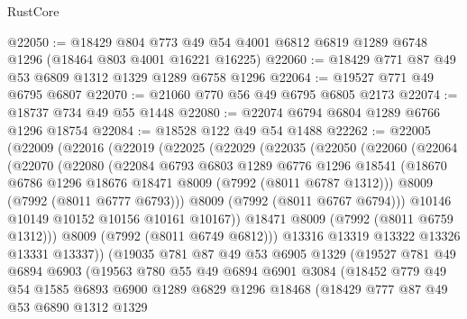 \begin{lexlean}{RustCore}
\begin{coremodule}
@22050 := @18429
    @804
    @773
    @49
    @54
    @4001
    @6812
    @6819
    @1289
    @6748
    @1296
    (@18464 @803 @4001 @16221 @16225)
@22060 := @18429 @771 @87 @49 @53 @6809 @1312 @1329 @1289 @6758 @1296
@22064 := @19527 @771 @49 @6795 @6807
@22070 := @21060 @770 @56 @49 @6795 @6805 @2173
@22074 := @18737 @734 @49 @55 @1448
@22080 := @22074 @6794 @6804 @1289 @6766 @1296 @18754
@22084 := @18528 @122 @49 @54 @1488
@22262 := @22005
    (@22009
      (@22016
        (@22019
          (@22025
            (@22029
              (@22035
                (@22050
                  (@22060
                    (@22064
                      (@22070
                        (@22080
                          (@22084
                            @6793
                            @6803
                            @1289
                            @6776
                            @1296
                            @18541
                            (@18670 @6786 @1296 @18676 @18471 @8009 (@7992 (@8011 @6787 @1312)))
                            @8009
                            (@7992 (@8011 @6777 @6793)))
                          @8009
                          (@7992 (@8011 @6767 @6794)))
                        @10146
                        @10149
                        @10152
                        @10156
                        @10161
                        @10167))
                    @18471
                    @8009
                    (@7992 (@8011 @6759 @1312)))
                  @8009
                  (@7992 (@8011 @6749 @6812)))
                @13316
                @13319
                @13322
                @13326
                @13331
                @13337))
            (@19035
              @781
              @87
              @49
              @53
              @6905
              @1329
              (@19527
                @781
                @49
                @6894
                @6903
                (@19563
                  @780
                  @55
                  @49
                  @6894
                  @6901
                  @3084
                  (@18452
                    @779
                    @49
                    @54
                    @1585
                    @6893
                    @6900
                    @1289
                    @6829
                    @1296
                    @18468
                    (@18429
                      @777
                      @87
                      @49
                      @53
                      @6890
                      @1312
                      @1329

\end{coremodule}
\end{lexlean}
